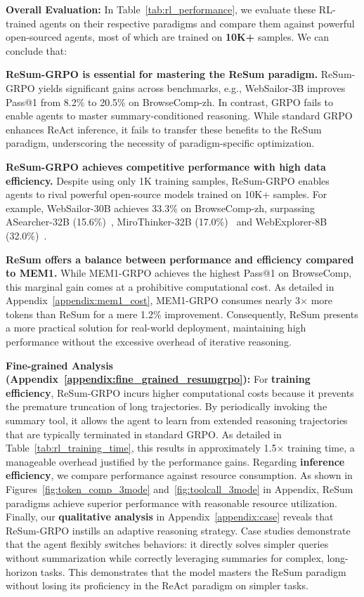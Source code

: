 \textbf{Overall Evaluation:} In Table~\ref{tab:rl_performance}, we evaluate these RL-trained agents on their respective paradigms and compare them against powerful open-sourced agents, most of which are trained on \textbf{10K+} samples. We can conclude that: 

\textbf{ReSum-GRPO is essential for mastering the ReSum paradigm.} ReSum-GRPO yields significant gains across benchmarks, e.g., WebSailor-3B improves Pass@1 from 8.2\% to 20.5\% on BrowseComp-zh. In contrast, GRPO fails to enable agents to master summary-conditioned reasoning. While standard GRPO enhances ReAct inference, it fails to transfer these benefits to the ReSum paradigm, underscoring the necessity of paradigm-specific optimization.

\textbf{ReSum-GRPO achieves competitive performance with high data efficiency.} Despite using only 1K training samples, ReSum-GRPO enables agents to rival powerful open-source models trained on 10K+ samples. For example, WebSailor-30B achieves 33.3\% on BrowseComp-zh, surpassing ASearcher-32B (15.6\%)~\citep{gao2025asearcher}, MiroThinker-32B (17.0\%)~\citep{miromind2025mirothinker} and WebExplorer-8B (32.0\%)~\citep{liu2025webexplorer}.

\textbf{ReSum offers a balance between performance and efficiency compared to MEM1.} While MEM1-GRPO achieves the highest Pass@1 on BrowseComp, this marginal gain comes at a prohibitive computational cost. As detailed in Appendix~\ref{appendix:mem1_cost}, MEM1-GRPO consumes nearly 3$\times$ more tokens than ReSum for a mere 1.2\% improvement. Consequently, ReSum presents a more practical solution for real-world deployment, maintaining high performance without the excessive overhead of iterative reasoning.

\textbf{Fine-grained Analysis (Appendix~\ref{appendix:fine_grained_resumgrpo}):} For \textbf{training efficiency}, ReSum-GRPO incurs higher computational costs because it prevents the premature truncation of long trajectories. By periodically invoking the summary tool, it allows the agent to learn from extended reasoning trajectories that are typically terminated in standard GRPO. As detailed in Table~\ref{tab:rl_training_time}, this results in approximately 1.5$\times$ training time, a manageable overhead justified by the performance gains. Regarding \textbf{inference efficiency}, we compare performance against resource consumption. As shown in Figures~\ref{fig:token_comp_3mode} and~\ref{fig:toolcall_3mode} in Appendix, ReSum paradigms achieve superior performance with reasonable resource utilization. Finally, our \textbf{qualitative analysis} in Appendix~\ref{appendix:case} reveals that ReSum-GRPO instills an adaptive reasoning strategy. Case studies demonstrate that the agent flexibly switches behaviors: it directly solves simpler queries without summarization while correctly leveraging summaries for complex, long-horizon tasks. This demonstrates that the model masters the ReSum paradigm without losing its proficiency in the ReAct paradigm on simpler tasks.


